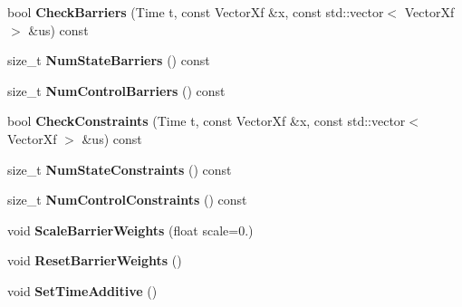 \begin{DoxyCompactItemize}
\item 
bool {\bfseries Check\+Barriers} (Time t, const Vector\+Xf \&x, const std\+::vector$<$ Vector\+Xf $>$ \&us) const \hypertarget{classilqgames_1_1_player_cost_afdf789ce1aba79245b9af55ffe97668e}{}\label{classilqgames_1_1_player_cost_afdf789ce1aba79245b9af55ffe97668e}

\item 
size\+\_\+t {\bfseries Num\+State\+Barriers} () const \hypertarget{classilqgames_1_1_player_cost_a45d657992c6f7c9aefdd134e1902dd82}{}\label{classilqgames_1_1_player_cost_a45d657992c6f7c9aefdd134e1902dd82}

\item 
size\+\_\+t {\bfseries Num\+Control\+Barriers} () const \hypertarget{classilqgames_1_1_player_cost_a9777b060432027514848f18015b8c81b}{}\label{classilqgames_1_1_player_cost_a9777b060432027514848f18015b8c81b}

\item 
bool {\bfseries Check\+Constraints} (Time t, const Vector\+Xf \&x, const std\+::vector$<$ Vector\+Xf $>$ \&us) const \hypertarget{classilqgames_1_1_player_cost_a7c3268b3d9f2d1768096ac0c3adb7cb9}{}\label{classilqgames_1_1_player_cost_a7c3268b3d9f2d1768096ac0c3adb7cb9}

\item 
size\+\_\+t {\bfseries Num\+State\+Constraints} () const \hypertarget{classilqgames_1_1_player_cost_a3b3e0bac90840bac45c57b74c9efcf19}{}\label{classilqgames_1_1_player_cost_a3b3e0bac90840bac45c57b74c9efcf19}

\item 
size\+\_\+t {\bfseries Num\+Control\+Constraints} () const \hypertarget{classilqgames_1_1_player_cost_a61ab18fcd64b4fb99014ef14178f61d1}{}\label{classilqgames_1_1_player_cost_a61ab18fcd64b4fb99014ef14178f61d1}

\item 
void {\bfseries Scale\+Barrier\+Weights} (float scale=0.)\hypertarget{classilqgames_1_1_player_cost_aecd0761c305c18284a348ab958e545ce}{}\label{classilqgames_1_1_player_cost_aecd0761c305c18284a348ab958e545ce}

\item 
void {\bfseries Reset\+Barrier\+Weights} ()\hypertarget{classilqgames_1_1_player_cost_aaac79536c50721cbe5051010f77fda48}{}\label{classilqgames_1_1_player_cost_aaac79536c50721cbe5051010f77fda48}

\item 
void {\bfseries Set\+Time\+Additive} ()\hypertarget{classilqgames_1_1_player_cost_aabdacf36b0f3bc01b96ea1b62da9737a}{}\label{classilqgames_1_1_player_cost_aabdacf36b0f3bc01b96ea1b62da9737a}


\end{DoxyCompactItemize}
